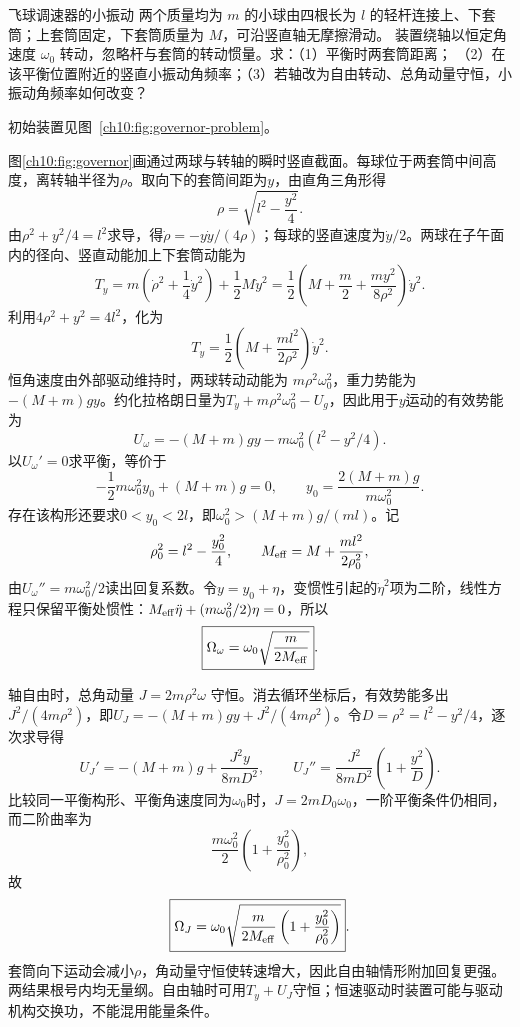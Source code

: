\begin{origexamplebox}{飞球调速器的小振动}\label{ch10:ex:governor}
两个质量均为 $m$ 的小球由四根长为 $l$ 的轻杆连接上、下套筒；上套筒固定，下套筒质量为 $M$，可沿竖直轴无摩擦滑动。
装置绕轴以恒定角速度 $\omega_0$ 转动，忽略杆与套筒的转动惯量。求：（1）平衡时两套筒距离；
（2）在该平衡位置附近的竖直小振动角频率；（3）若轴改为自由转动、总角动量守恒，小振动角频率如何改变？

初始装置见图~\ref{ch10:fig:governor-problem}。
\chTenGovernorProblemFigure
\end{origexamplebox}
\begin{xesolution}
图\ref{ch10:fig:governor}画通过两球与转轴的瞬时竖直截面。每球位于两套筒中间高度，离转轴半径为$\rho$。取向下的套筒间距为$y$，由直角三角形得
\[
 \rho=\sqrt{l^2-\frac{y^2}{4}}.
\]
\chTenGovernorFigure
由$\rho^2+y^2/4=l^2$求导，得$\dot\rho=-y\dot y/(4\rho)$；每球的竖直速度为$\dot y/2$。两球在子午面内的径向、竖直动能加上下套筒动能为
\[
 T_y=m\left(\dot\rho^2+\frac14\dot y^2\right)+\frac12M\dot y^2
 =\frac12\left(M+\frac m2+\frac{my^2}{8\rho^2}\right)\dot y^2.
\]
利用$4\rho^2+y^2=4l^2$，化为
\[
 T_y=\frac12\left(M+\frac{ml^2}{2\rho^2}\right)\dot y^2.
\]
恒角速度由外部驱动维持时，两球转动动能为 $m\rho^2\omega_0^2$，重力势能为
$-(M+m)gy$。约化拉格朗日量为$T_y+m\rho^2\omega_0^2-U_g$，因此用于$y$运动的有效势能为
\[
 U_\omega=-(M+m)gy-m\omega_0^2(l^2-y^2/4).
\]
以$U_\omega'=0$求平衡，等价于
\[
 -\frac12m\omega_0^2y_0+(M+m)g=0,\qquad
 \boxed{y_0=\frac{2(M+m)g}{m\omega_0^2}}.
\]
存在该构形还要求$0<y_0<2l$，即$\omega_0^2>(M+m)g/(ml)$。记
\[
 \rho_0^2=l^2-\frac{y_0^2}{4},\qquad
 M_{\rm eff}=M+\frac{ml^2}{2\rho_0^2},
\]
由$U_\omega''=m\omega_0^2/2$读出回复系数。令$y=y_0+\eta$，变惯性引起的$\dot\eta^2$项为二阶，线性方程只保留平衡处惯性：$M_{\rm eff}\ddot\eta+(m\omega_0^2/2)\eta=0$，所以
\[
 \boxed{\Omega_{\omega}=\omega_0
 \sqrt{\frac{m}{2M_{\rm eff}}}}.
\]

轴自由时，总角动量 $J=2m\rho^2\omega$ 守恒。消去循环坐标后，有效势能多出
$J^2/(4m\rho^2)$，即$U_J=-(M+m)gy+J^2/(4m\rho^2)$。令$D=\rho^2=l^2-y^2/4$，逐次求导得
\[
 U_J'=-(M+m)g+\frac{J^2y}{8mD^2},\qquad
 U_J''=\frac{J^2}{8mD^2}\left(1+\frac{y^2}{D}\right).
\]
比较同一平衡构形、平衡角速度同为$\omega_0$时，$J=2mD_0\omega_0$，一阶平衡条件仍相同，而二阶曲率为
\[
 \frac{m\omega_0^2}{2}\left(1+\frac{y_0^2}{\rho_0^2}\right),
\]
故
\[
 \boxed{\Omega_J=\omega_0
 \sqrt{\frac{m}{2M_{\rm eff}}
 \left(1+\frac{y_0^2}{\rho_0^2}\right)}}.
\]
套筒向下运动会减小$\rho$，角动量守恒使转速增大，因此自由轴情形附加回复更强。两结果根号内均无量纲。自由轴时可用$T_y+U_J$守恒；恒速驱动时装置可能与驱动机构交换功，不能混用能量条件。
\end{xesolution}

